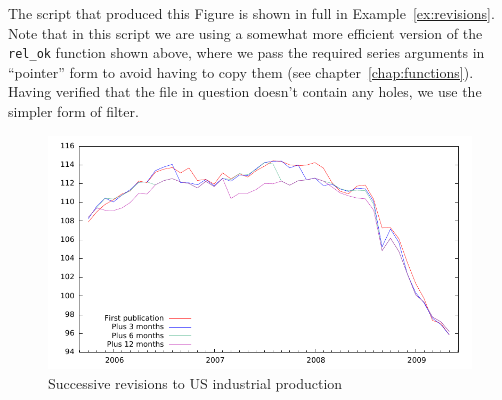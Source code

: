 The script that produced this Figure is shown in full in
Example~\ref{ex:revisions}. Note that in this script we are using a
somewhat more efficient version of the \verb|rel_ok| function shown
above, where we pass the required series arguments in ``pointer'' form
to avoid having to copy them (see
chapter~\ref{chap:functions}). Having verified that the file in
question doesn't contain any holes, we use the simpler form of filter.

\begin{figure}[htbp]
  \centering
\includegraphics{figures/realtime}
  \caption{Successive revisions to US industrial production}
  \label{fig:realtime-lag}
\end{figure}

